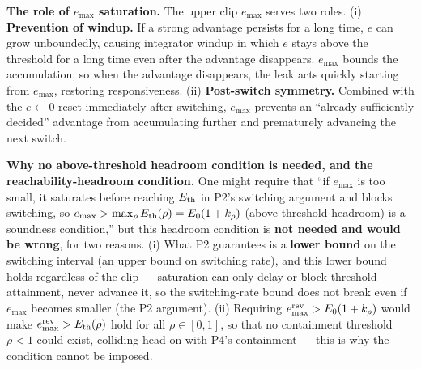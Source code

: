 \noindent\textbf{The role of $e_{\max}$ saturation.} The upper clip $e_{\max}$ serves two roles. (i) \textbf{Prevention of windup.} If a strong advantage persists for a long time, $e$ can grow unboundedly, causing integrator windup in which $e$ stays above the threshold for a long time even after the advantage disappears. $e_{\max}$ bounds the accumulation, so when the advantage disappears, the leak acts quickly starting from $e_{\max}$, restoring responsiveness. (ii) \textbf{Post-switch symmetry.} Combined with the $e \leftarrow 0$ reset immediately after switching, $e_{\max}$ prevents an ``already sufficiently decided'' advantage from accumulating further and prematurely advancing the next switch.

\noindent\textbf{Why no above-threshold headroom condition is needed, and the reachability-headroom condition.} One might require that ``if $e_{\max}$ is too small, it saturates before reaching $E_{\text{th}}$ in P2's switching argument and blocks switching, so $e_{\max} > \max_\rho E_{\text{th}}(\rho) = E_0(1+k_\rho)$ (above-threshold headroom) is a soundness condition,'' but this headroom condition is \textbf{not needed and would be wrong}, for two reasons. (i) What P2 guarantees is a \textbf{lower bound} on the switching interval (an upper bound on switching rate), and this lower bound holds regardless of the clip --- saturation can only delay or block threshold attainment, never advance it, so the switching-rate bound does not break even if $e_{\max}$ becomes smaller (the P2 argument). (ii) Requiring $e^{\text{rev}}_{\max} > E_0(1+k_\rho)$ would make $e^{\text{rev}}_{\max} > E_{\text{th}}(\rho)$ hold for all $\rho \in [0,1]$, so that no containment threshold $\bar\rho < 1$ could exist, colliding head-on with P4's containment --- this is why the condition cannot be imposed.

